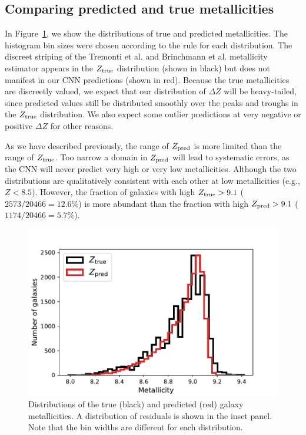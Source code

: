 \documentclass[fleqn,usenatbib]{mnras}
\begin{document}
\subsection{Comparing predicted and true metallicities}

In Figure~\ref{fig:distributions}, we show the distributions of true and predicted metallicities.
The histogram bin sizes were chosen according to the \cite{Freedman1981} rule for each distribution.
The discreet striping of the Tremonti et al. and Brinchmann et al. metallicity estimator appears in the $Z_{\rm true}$ distribution (shown in black) but does not manifest in our CNN predictions (shown in red).
Because the true metallicities are discreetly valued, we expect that our distribution of $\Delta Z$ will be heavy-tailed, since predicted values still be distributed smoothly over the peaks and troughs in the $Z_{\rm true}$ distribution.
We also expect some outlier predictions at very negative or positive $\Delta Z$ for other reasons.

As we have described previously, the range of $Z_{\rm pred}$ is more limited than the range of $Z_{\rm true}$.
Too narrow a domain in $Z_{\rm pred}$ will lead to systematic errors, as the CNN will never predict very high or very low metallicities.
Although the two distributions are qualitatively consistent with each other at low metallicities (e.g., $Z < 8.5$).
However, the fraction of galaxies with high $Z_{\rm true} > 9.1$ ($2573/20466 = 12.6\%$) is more abundant than the fraction with high $Z_{\rm pred} > 9.1$ ($1174/20466 = 5.7\%$).


\begin{figure}
	\includegraphics[width=\columnwidth]{03-Z_distribution.pdf}
	\caption{\label{fig:distributions}
		Distributions of the true (black) and predicted (red) galaxy metallicities.
		A distribution of residuals is shown in the inset panel.
		Note that the bin widths are different for each distribution.}
\end{figure}
\end{document}
